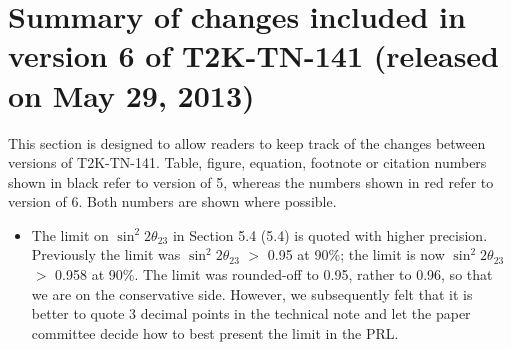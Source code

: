 
\section{Summary of changes included in version 6 of T2K-TN-141 (released on May 29, 2013)}

This section is designed to allow readers to keep track of the changes between versions of T2K-TN-141.
Table, figure, equation, footnote or citation numbers shown in black refer to version of 5,
{\color{red}whereas the numbers shown in red refer to version of 6}.
Both numbers are shown where possible.

\begin{itemize}

\item
  The limit on $\sin^2 2\theta_{23}$ in Section 5.4 {\color{red}(5.4)}
  is quoted with higher precision.
  Previously the limit was $\sin^{2}2\theta_{23}$ $>$ 0.95 at 90\%;
  the limit is now $\sin^{2}2\theta_{23}$ $>$ 0.958 at 90\%.
  The limit was rounded-off to 0.95, rather to 0.96, so that we are on the conservative side.
  However, we subsequently felt that it is better to quote 3 decimal points in the technical note
  and let the paper committee decide how to best present the limit in the PRL.

\end{itemize}





